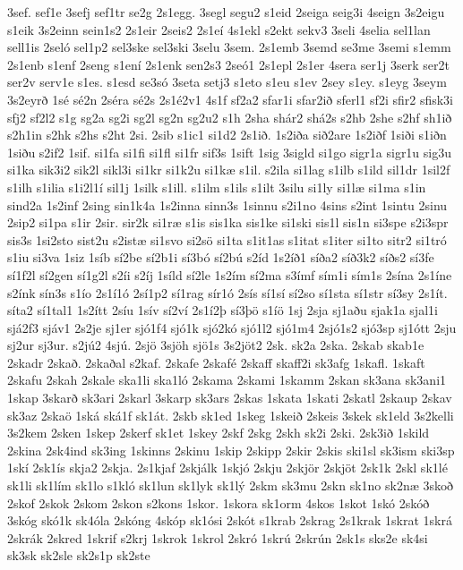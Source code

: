 {3sef.
sef1e
3sefj
sef1tr
se2g
2s1egg.
3segl
segu2
s1eid
2seiga
seig3i
4seign
3s2eigu
s1eik
3s2einn
sein1s2
2s1eir
2seis2
2s1eí
4s1ekl
s2ekt
sekv3
3seli
4selia
sel1lan
sell1is
2seló
sel1p2
sel3ske
sel3ski
3selu
3sem.
2s1emb
3semd
se3me
3semi
s1emm
2s1enb
s1enf
2seng
s1ení
2s1enk
sen2s3
2seó1
2s1epl
2s1er
4sera
ser1j
3serk
ser2t
ser2v
serv1e
s1es.
s1esd
se3só
3seta
setj3
s1eto
s1eu
s1ev
2sey
s1ey.
s1eyg
3seym
3s2eyrð
1sé
sé2n
2séra
sé2s
2s1é2v1
4s1f
sf2a2
sfar1i
sfar2ið
sferl1
sf2i
sfir2
sfisk3i
sfj2
sf2l2
s1g
sg2a
sg2i
sg2l
sg2n
sg2u2
s1h
2sha
shár2
shá2s
s2hb
2she
s2hf
sh1ið
s2h1in
s2hk
s2hs
s2ht
2si.
2sib
s1ic1
si1d2
2s1ið.
1s2iða
sið2are
1s2iðf
1siði
s1iðn
1siðu
s2if2
1sif.
si1fa
si1fi
si1fl
si1fr
sif3s
1sift
1sig
3sigld
si1go
sigr1a
sigr1u
sig3u
si1ka
sik3i2
sik2l
sikl3i
si1kr
si1k2u
si1kæ
s1il.
s2ila
si1lag
s1ilb
s1ild
sil1dr
1sil2f
s1ilh
s1ilia
s1i2l1í
sil1j
1silk
s1ill.
s1ilm
s1ils
s1ilt
3silu
si1ly
si1læ
si1ma
s1in
sind2a
1s2inf
2sing
sin1k4a
1s2inna
sinn3s
1sinnu
s2i1no
4sins
s2int
1sintu
2sinu
2sip2
si1pa
s1ir
2sir.
sir2k
si1ræ
s1is
sis1ka
sis1ke
si1ski
sis1l
sis1n
si3spe
s2i3spr
sis3s
1si2sto
sist2u
s2istæ
si1svo
si2sö
si1ta
s1it1as
s1itat
s1iter
si1to
sitr2
si1tró
s1iu
si3va
1siz
1síb
sí2be
sí2b1i
sí3bó
sí2bú
s2íd
1s2íð1
síða2
síð3k2
síðs2
sí3fe
sí1f2l
sí2gen
sí1g2l
s2íi
s2íj
1síld
sí2le
1s2ím
sí2ma
s3ímf
sím1i
sím1s
2sína
2s1íne
s2ínk
sín3s
s1ío
2s1í1ó
2sí1p2
sí1rag
sír1ó
2sís
sí1sí
sí2so
sí1sta
sí1str
sí3sy
2s1ít.
síta2
sí1tal1
1s2ítt
2síu
1sív
sí2ví
2s1í2þ
sí3þö
s1íö
1sj
2sja
sj1aðu
sjak1a
sjal1i
sjá2f3
sjáv1
2s2je
sj1er
sjó1f4
sjó1k
sjó2kó
sjó1l2
sjó1m4
2sjó1s2
sjó3sp
sj1ótt
2sju
sj2ur
sj3ur.
s2jú2
4sjú.
2sjö
3sjöh
sjö1s
3s2jöt2
2sk.
sk2a
2ska.
2skab
skab1e
2skadr
2skað.
2skaðal
s2kaf.
2skafe
2skafé
2skaff
skaff2i
sk3afg
1skafl.
1skaft
2skafu
2skah
2skale
ska1li
ska1ló
2skama
2skami
1skamm
2skan
sk3ana
sk3ani1
1skap
3skarð
sk3ari
2skarl
3skarp
sk3ars
2skas
1skata
1skati
2skatl
2skaup
2skav
sk3az
2skaö
1ská
ská1f
sk1át.
2skb
sk1ed
1skeg
1skeið
2skeis
3skek
sk1eld
3s2kelli
3s2kem
2sken
1skep
2skerf
sk1et
1skey
2skf
2skg
2skh
sk2i
2ski.
2sk3ið
1skild
2skina
2sk4ind
sk3ing
1skinns
2skinu
1skip
2skipp
2skir
2skis
ski1sl
sk3ism
ski3sp
1skí
2sk1ís
skja2
2skja.
2s1kjaf
2skjálk
1skjó
2skju
2skjör
2skjöt
2sk1k
2skl
sk1lé
sk1li
sk1lím
sk1lo
s1kló
sk1lun
sk1lyk
sk1lý
2skm
sk3mu
2skn
sk1no
sk2næ
3skoð
2skof
2skok
2skom
2skon
s2kons
1skor.
1skora
sk1orm
4skos
1skot
1skó
2skóð
3skóg
skó1k
sk4óla
2skóng
4skóp
sk1ósi
2skót
s1krab
2skrag
2s1krak
1skrat
1skrá
2skrák
2skred
1skrif
s2krj
1skrok
1skrol
2skró
1skrú
2skrún
2sk1s
sks2e
sk4si
sk3sk
sk2sle
sk2s1p
sk2ste
}
